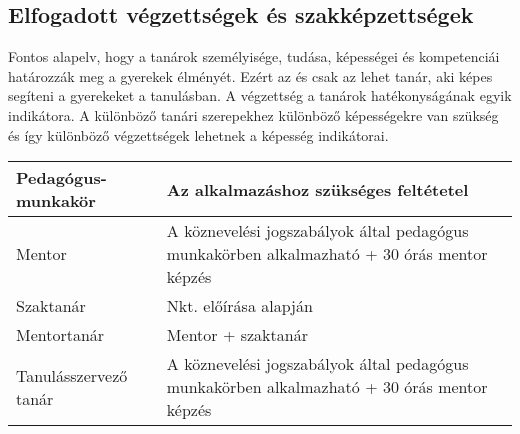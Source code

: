 \hypertarget{elfogadott-vegzettsegek-es-szakkepzettsegek}{%
\subsection{Elfogadott végzettségek és
szakképzettségek}\label{elfogadott-vegzettsegek-es-szakkepzettsegek}}

Fontos alapelv, hogy a tanárok személyisége, tudása, képességei és
kompetenciái határozzák meg a gyerekek élményét. Ezért az és csak az
lehet tanár, aki képes segíteni a gyerekeket a tanulásban. A végzettség
a tanárok hatékonyságának egyik indikátora. A különböző tanári
szerepekhez különböző képességekre van szükség és így különböző
végzettségek lehetnek a képesség indikátorai.

\begin{longtable}[]{@{}ll@{}}
\toprule
\begin{minipage}[b]{0.18\columnwidth}\raggedright
Pedagógus-munkakör\strut
\end{minipage} & \begin{minipage}[b]{0.76\columnwidth}\raggedright
Az alkalmazáshoz szükséges feltétetel\strut
\end{minipage}\tabularnewline
\midrule
\endhead
\begin{minipage}[t]{0.18\columnwidth}\raggedright
Mentor\strut
\end{minipage} & \begin{minipage}[t]{0.76\columnwidth}\raggedright
A köznevelési jogszabályok által pedagógus munkakörben alkalmazható + 30
órás mentor képzés\strut
\end{minipage}\tabularnewline
\begin{minipage}[t]{0.18\columnwidth}\raggedright
Szaktanár\strut
\end{minipage} & \begin{minipage}[t]{0.76\columnwidth}\raggedright
Nkt. előírása alapján\strut
\end{minipage}\tabularnewline
\begin{minipage}[t]{0.18\columnwidth}\raggedright
Mentortanár\strut
\end{minipage} & \begin{minipage}[t]{0.76\columnwidth}\raggedright
Mentor + szaktanár\strut
\end{minipage}\tabularnewline
\begin{minipage}[t]{0.18\columnwidth}\raggedright
Tanulásszervező tanár\strut
\end{minipage} & \begin{minipage}[t]{0.76\columnwidth}\raggedright
A köznevelési jogszabályok által pedagógus munkakörben alkalmazható + 30
órás mentor képzés\strut
\end{minipage}\tabularnewline
\bottomrule
\end{longtable}

